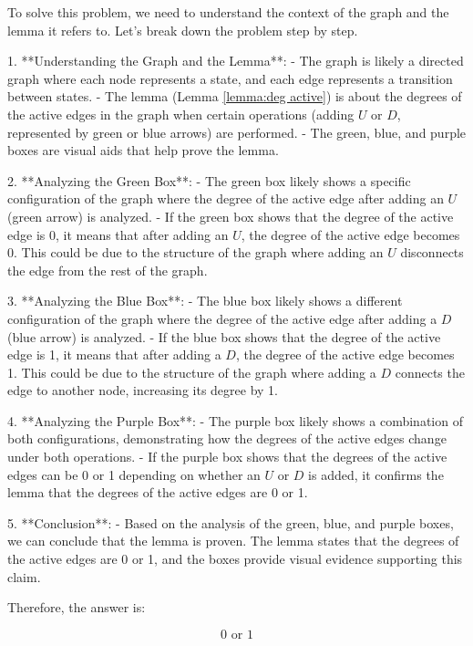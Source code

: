 To solve this problem, we need to understand the context of the graph and the lemma it refers to. Let's break down the problem step by step.

1. **Understanding the Graph and the Lemma**:
   - The graph is likely a directed graph where each node represents a state, and each edge represents a transition between states.
   - The lemma (Lemma \ref{lemma:deg active}) is about the degrees of the active edges in the graph when certain operations (adding \(U\) or \(D\), represented by green or blue arrows) are performed.
   - The green, blue, and purple boxes are visual aids that help prove the lemma.

2. **Analyzing the Green Box**:
   - The green box likely shows a specific configuration of the graph where the degree of the active edge after adding an \(U\) (green arrow) is analyzed.
   - If the green box shows that the degree of the active edge is 0, it means that after adding an \(U\), the degree of the active edge becomes 0. This could be due to the structure of the graph where adding an \(U\) disconnects the edge from the rest of the graph.

3. **Analyzing the Blue Box**:
   - The blue box likely shows a different configuration of the graph where the degree of the active edge after adding a \(D\) (blue arrow) is analyzed.
   - If the blue box shows that the degree of the active edge is 1, it means that after adding a \(D\), the degree of the active edge becomes 1. This could be due to the structure of the graph where adding a \(D\) connects the edge to another node, increasing its degree by 1.

4. **Analyzing the Purple Box**:
   - The purple box likely shows a combination of both configurations, demonstrating how the degrees of the active edges change under both operations.
   - If the purple box shows that the degrees of the active edges can be 0 or 1 depending on whether an \(U\) or \(D\) is added, it confirms the lemma that the degrees of the active edges are 0 or 1.

5. **Conclusion**:
   - Based on the analysis of the green, blue, and purple boxes, we can conclude that the lemma is proven. The lemma states that the degrees of the active edges are 0 or 1, and the boxes provide visual evidence supporting this claim.

Therefore, the answer is:

\[
\boxed{0 \text{ or } 1}
\]